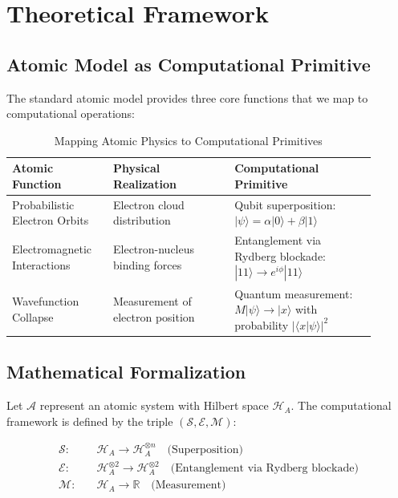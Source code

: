 \documentclass[12pt]{article}
\begin{document}
\section{Theoretical Framework}

\subsection{Atomic Model as Computational Primitive}
The standard atomic model provides three core functions that we map to computational operations:

\begin{table}[H]
\centering
\caption{Mapping Atomic Physics to Computational Primitives}
\begin{tabular}{p{0.25\linewidth}p{0.3\linewidth}p{0.35\linewidth}}
\toprule
\textbf{Atomic Function} & \textbf{Physical Realization} & \textbf{Computational Primitive} \\
\midrule
Probabilistic Electron Orbits & Electron cloud distribution & Qubit superposition: $|\psi\rangle = \alpha|0\rangle + \beta|1\rangle$ \\
Electromagnetic Interactions & Electron-nucleus binding forces & Entanglement via Rydberg blockade: $|11\rangle \rightarrow e^{i\phi}|11\rangle$ \\
Wavefunction Collapse & Measurement of electron position & Quantum measurement: $M|\psi\rangle \rightarrow |x\rangle$ with probability $|\langle x|\psi\rangle|^2$ \\
\bottomrule
\end{tabular}
\end{table}

\subsection{Mathematical Formalization}
Let $\mathcal{A}$ represent an atomic system with Hilbert space $\mathcal{H}_A$. The computational framework is defined by the triple $(\mathcal{S}, \mathcal{E}, \mathcal{M})$:

\begin{align}
\mathcal{S}: & \quad \mathcal{H}_A \rightarrow \mathcal{H}_A^{\otimes n} \quad \text{(Superposition)} \\
\mathcal{E}: & \quad \mathcal{H}_A^{\otimes 2} \rightarrow \mathcal{H}_A^{\otimes 2} \quad \text{(Entanglement via Rydberg blockade)} \\
\mathcal{M}: & \quad \mathcal{H}_A \rightarrow \mathbb{R} \quad \text{(Measurement)}
\end{align}
\end{document}
